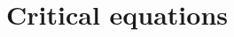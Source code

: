 \documentclass[aps,prd,notitlepage,nofootinbib,superscriptaddress,groupedaddress,twocolumn]{revtex4-1}
\def\be{\begin{eqnarray}}
\def\ee{\end{eqnarray}}
\newcommand{\ca}{\mathcal A}
\newcommand{\cm}{\mathcal M}
\newcommand{\cs}{\mathcal S}
\newcommand{\sig}{\sigma}
\renewcommand{\L }{\Lambda}
\renewcommand{\O}{\Omega}
\newcommand{\rmd}{\mathrm d}
\newcommand{\lt}{\left}
\newcommand{\rt}{\right}
\begin{document}



\section{Critical equations}\label{Derivatives of Sp}
\end{document}
